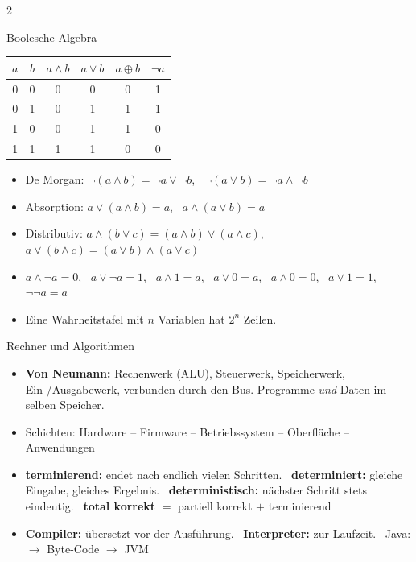 \documentclass[fontsize=10pt,a4paper,DIV=20,headsepline]{scrartcl}
\newenvironment{kl}{\begin{itemize}[leftmargin=3mm, itemsep=0.1mm, topsep=0.3mm, parsep=0pt, label=\textcolor{diagramm}{\textbullet}]}{\end{itemize}}
\begin{document}
\begin{multicols}{2}
\begin{fs}{Boolesche Algebra}
\begin{center}{\scriptsize\setlength{\tabcolsep}{4pt}
\begin{tabular}{@{}cc|cccc@{}}
$a$ & $b$ & $a \wedge b$ & $a \vee b$ & $a \oplus b$ & $\neg a$ \\ \hline
0 & 0 & 0 & 0 & 0 & 1 \\
0 & 1 & 0 & 1 & 1 & 1 \\
1 & 0 & 0 & 1 & 1 & 0 \\
1 & 1 & 1 & 1 & 0 & 0
\end{tabular}}\end{center}\vspace{-2mm}

\begin{kl}
\item De Morgan: $\neg(a \wedge b) = \neg a \vee \neg b$, \ $\neg(a \vee b) = \neg a \wedge \neg b$
\item Absorption: $a \vee (a \wedge b) = a$, \ $a \wedge (a \vee b) = a$
\item Distributiv: $a \wedge (b \vee c) = (a \wedge b) \vee (a \wedge c)$, \ $a \vee (b \wedge c) = (a \vee b) \wedge (a \vee c)$
\item $a \wedge \neg a = 0$, \ $a \vee \neg a = 1$, \ $a \wedge 1 = a$, \ $a \vee 0 = a$, \ $a \wedge 0 = 0$, \ $a \vee 1 = 1$, \ $\neg\neg a = a$
\item Eine Wahrheitstafel mit $n$ Variablen hat $2^n$ Zeilen.
\end{kl}
\end{fs}

\begin{fs}{Rechner und Algorithmen}
\begin{kl}
\item \textbf{Von Neumann:} Rechenwerk (ALU), Steuerwerk, Speicherwerk, Ein-/Ausgabewerk, verbunden durch den Bus. Programme \emph{und} Daten im selben Speicher.
\item Schichten: Hardware -- Firmware -- Betriebssystem -- Oberfläche -- Anwendungen
\item \textbf{terminierend:} endet nach endlich vielen Schritten. \ \textbf{determiniert:} gleiche Eingabe, gleiches Ergebnis. \ \textbf{deterministisch:} nächster Schritt stets eindeutig. \ \textbf{total korrekt} $=$ partiell korrekt $+$ terminierend
\item \textbf{Compiler:} übersetzt vor der Ausführung. \ \textbf{Interpreter:} zur Laufzeit. \ Java:  $\to$ Byte-Code $\to$ JVM
\end{kl}
\end{fs}


\end{multicols}
\end{document}
